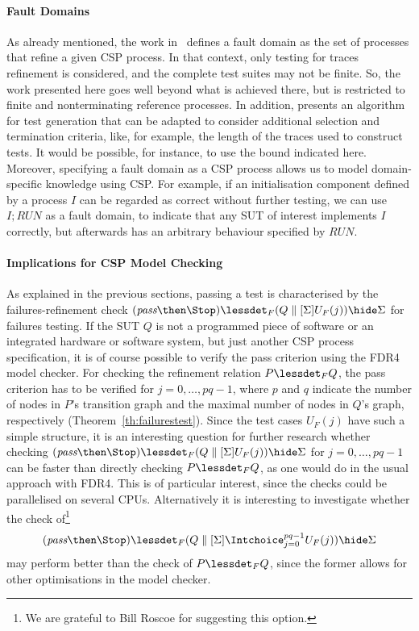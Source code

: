 \documentclass[3p,times]{elsarticle}
\newcommand{\epass}{{\text{\it pass}}}
\begin{document}
\paragraph{Fault Domains} As already mentioned, the work
in~\cite{DBLP:conf/pts/CavalcantiS17} defines a fault domain as the set of
processes that refine a given CSP process.  In that context, only testing for
traces refinement is considered, and the complete test suites may not be
finite. So, the work presented here goes well beyond what is achieved there,
but is restricted to finite and nonterminating reference processes. In
addition, \cite{DBLP:conf/pts/CavalcantiS17} presents an algorithm for test
generation that can be adapted to consider additional selection and
termination criteria, like, for example, the length of the traces used to
construct tests. It would be possible, for instance, to use the bound
indicated here. Moreover, specifying a fault domain as a CSP process allows
us to model domain-specific knowledge using CSP. For example, if an
initialisation component defined by a process $I$ can be regarded as correct
without further testing, we can use $I; RUN$ as a fault domain, to indicate
that any SUT of interest implements $I$ correctly, but afterwards has an
arbitrary behaviour specified by $RUN$.

\paragraph{Implications for CSP Model Checking} As explained in the previous
sections, passing a test is characterised by the failures-refinement check
$(\epass\then\Stop) \lessdet_F (Q\parallel[\Sigma] U_F(j)) \hide \Sigma$ for
failures testing. If the SUT $Q$ is not a programmed piece of software or an
integrated hardware or software system, but just another CSP process
specification, it is of course possible to verify the pass criterion using
the FDR4 model checker. For checking the refinement relation $P\lessdet_F Q$,
the pass criterion has to be verified for $j=0,\dots,pq-1$, where $p$ and $q$
indicate the number of nodes in $P$'s transition graph and the maximal number
of nodes in $Q$'s graph, respectively (Theorem~\ref{th:failurestest}). Since
the test cases $U_F(j)$ have such a simple structure, it is an interesting
question for further research whether checking $(\epass\then\Stop) \lessdet_F
(Q\parallel[\Sigma] U_F(j)) \hide \Sigma$ for $j=0,\dots,pq-1$ can be faster
than directly checking $P\lessdet_F Q$, as one would do in the usual approach
with FDR4. This is of particular interest, since the checks could be
parallelised on several CPUs. Alternatively it is interesting to investigate
whether the check of\footnote{We are grateful to Bill Roscoe for suggesting
this option.}
\[
(\epass\then\Stop) \lessdet_F (Q\parallel[\Sigma] \Intchoice_{j=0}^{pq-1} U_F(j)) \hide \Sigma
\]
may perform better than the check of $P\lessdet_F Q$, since the former allows for
other optimisations in the model checker.
\end{document}

